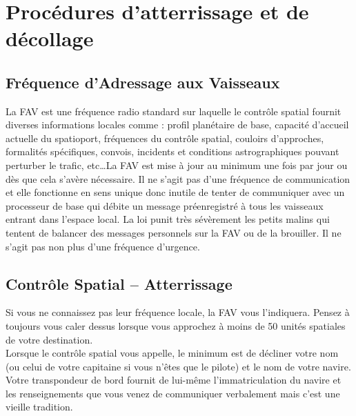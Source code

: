 \documentclass{article}
\begin{document}
\title{\vspace{-0.5cm}{\Huge Spatioports} \vspace{-1cm}}

\date{}

\maketitle

\section*{Procédures d'atterrissage et de décollage}
\subsection*{Fréquence d'Adressage aux Vaisseaux}
La FAV est une fréquence radio standard sur laquelle le contrôle spatial fournit diverses informations locales comme : profil planétaire de base, capacité d'accueil actuelle du spatioport, fréquences du contrôle spatial, couloirs d'approches, formalités spécifiques, convois, incidents et conditions astrographiques pouvant perturber le trafic, etc\ldots La FAV est mise à jour au minimum une fois par jour ou dès que cela s'avère nécessaire. Il ne s'agit pas d'une fréquence de communication et elle fonctionne en sens unique donc inutile de tenter de communiquer avec un processeur de base qui débite un message préenregistré à tous les vaisseaux entrant dans l'espace local. La loi punit très sévèrement les petits malins qui tentent de balancer des messages personnels sur la FAV ou de la brouiller. Il ne s'agit pas non plus d'une fréquence d'urgence.

\subsection*{Contrôle Spatial -- Atterrissage}
Si vous ne connaissez pas leur fréquence locale, la FAV vous l'indiquera. Pensez à toujours vous caler dessus lorsque vous approchez à moins de 50 unités spatiales de votre destination.\\

Lorsque le contrôle spatial vous appelle, le minimum est de décliner votre nom (ou celui de votre capitaine si vous n'êtes que le pilote) et le nom de votre navire. Votre transpondeur de bord fournit de lui-même l'immatriculation du navire et les renseignements que vous venez de communiquer verbalement mais c'est une vieille tradition.\\
\end{document}
